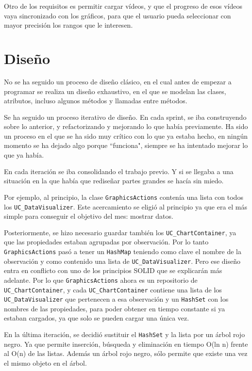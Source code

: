 Otro de los requisitos es permitir cargar v\'ideos, y que el progreso de esos v\'ideos vaya
sincronizado con los gr\'aficos, para que el usuario pueda seleccionar con mayor precisi\'on los
rangos que le interesen.

\section{Dise\~{n}o}
No se ha seguido un proceso de dise\~no cl\'asico, en el cual antes de empezar a programar se realiza
un dise\~no exhaustivo, en el que se modelan las clases, atributos, incluso algunos m\'etodos y
llamadas entre m\'etodos.

Se ha seguido un proceso iterativo de dise\~no. En cada sprint, se iba construyendo sobre lo anterior, y refactorizando
y mejorando lo que hab\'ia previamente. Ha sido un proceso en el que se ha sido muy cr\'itico con lo que ya estaba
hecho, en ning\'un momento se ha dejado algo porque ``funciona", siempre se ha intentado mejorar lo que ya hab\'ia.

En cada iteraci\'on se iba consolidando el trabajo previo. Y si se llegaba a una situaci\'on en la que hab\'ia que redise\~nar
partes grandes se hac\'ia sin miedo.

Por ejemplo, al principio, la clase \texttt{GraphicsActions} conten\'ia una lista con todos los 
\texttt{UC\_DataVisualizer}. Este
acercamiento se eligi\'o al principio ya que era el m\'as simple para conseguir el objetivo del mes: mostrar datos.

Posteriormente, se hizo necesario guardar tambi\'en los \texttt{UC\_ChartContainer}, ya que las propiedades estaban agrupadas por
observaci\'on. Por lo tanto \texttt{GraphicsActions} pas\'o a tener un \texttt{HashMap} teniendo como clave el nombre de la 
observaci\'on
y como contenido una lista de \texttt{UC\_DataVisualizer}. Pero ese dise\~no entra en conflicto con uno de los principios
SOLID que se explicar\'an m\'as adelante. Por lo que \texttt{GraphicsActions} ahora es un repositorio de 
\texttt{UC\_ChartContainer},
y cada \texttt{UC\_ChartContainer} contiene una lista de los\texttt{ UC\_DataVisualizer} que 
pertenecen a esa observaci\'on y un \texttt{HashSet}
con los nombres de las propiedades, para poder obtener en tiempo constante si ya estaban cargados, ya que solo se pueden cargar
una \'unica vez.

En la \'ultima iteraci\'on, se decidi\'o sustituir el \texttt{HashSet} y la lista por un \'arbol rojo negro. Ya que permite
inserci\'on, b\'usqueda y eliminaci\'on en tiempo O(ln n) frente al O(n) de las listas. 
Adem\'as un \'arbol rojo negro, s\'olo permite que existe una vez el mismo objeto en el \'arbol.

